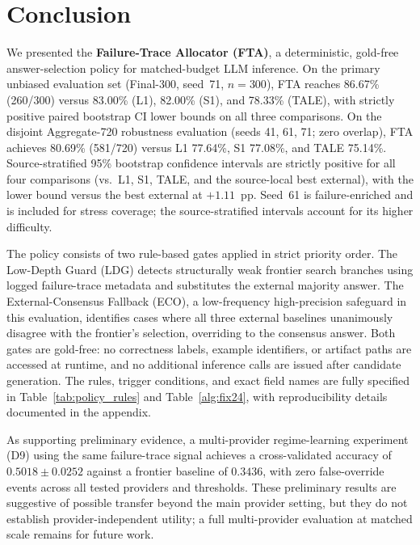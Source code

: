 \section{Conclusion}
\label{sec:conclusion}

We presented the \textbf{Failure-Trace Allocator (FTA)}, a deterministic,
gold-free answer-selection policy for matched-budget LLM inference.
On the primary unbiased evaluation set (Final-300, seed~71, $n=300$), FTA
reaches 86.67\% (260/300) versus 83.00\% (L1), 82.00\% (S1), and 78.33\%
(TALE), with strictly positive paired bootstrap CI lower bounds on all three
comparisons.
On the disjoint Aggregate-720 robustness evaluation (seeds 41, 61, 71; zero
overlap), FTA achieves 80.69\% (581/720) versus L1 77.64\%, S1 77.08\%, and
TALE 75.14\%.
Source-stratified 95\% bootstrap confidence intervals are strictly positive
for all four comparisons (vs.\ L1, S1, TALE, and the source-local best
external), with the lower bound versus the best external at $+1.11$~pp.
Seed~61 is failure-enriched and is included for stress coverage; the
source-stratified intervals account for its higher difficulty.

The policy consists of two rule-based gates applied in strict priority order.
The Low-Depth Guard (LDG) detects structurally weak frontier search branches
using logged failure-trace metadata and substitutes the external majority
answer.
The External-Consensus Fallback (ECO), a low-frequency high-precision
safeguard in this evaluation, identifies cases where all three external
baselines unanimously disagree with the frontier's selection, overriding
to the consensus answer.
Both gates are gold-free: no correctness labels, example identifiers, or
artifact paths are accessed at runtime, and no additional inference calls are
issued after candidate generation.
The rules, trigger conditions, and exact field names are fully specified in
Table~\ref{tab:policy_rules} and Table~\ref{alg:fix24}, with reproducibility
details documented in the appendix.

As supporting preliminary evidence, a multi-provider regime-learning experiment (D9) using
the same failure-trace signal achieves a cross-validated accuracy of
$0.5018 \pm 0.0252$ against a frontier baseline of $0.3436$, with zero
false-override events across all tested providers and thresholds.
These preliminary results are suggestive of possible transfer beyond the
main provider setting, but they do not establish provider-independent
utility; a full multi-provider evaluation at matched scale remains for
future work.


